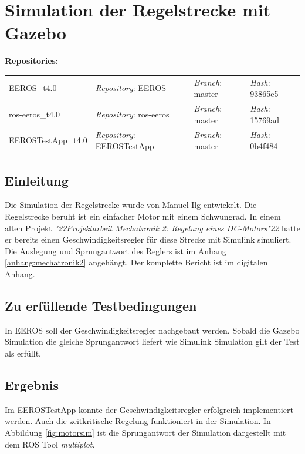 \section{Simulation der Regelstrecke mit Gazebo}
\textbf{Repositories:} \\
\begin{tabular}
  { l						| l			 							l								 l								}

  EEROS\_t4.0				& \textit{Repository}: EEROS			& \textit{Branch}: master		& \textit{Hash}: 93865e5		\\
  ros-eeros\_t4.0			& \textit{Repository}: ros-eeros		& \textit{Branch}: master		& \textit{Hash}: 15769ad		\\
  EEROSTestApp\_t4.0		& \textit{Repository}: EEROSTestApp		& \textit{Branch}: master		& \textit{Hash}: 0b4f484		\\
\end{tabular}

\subsection{Einleitung}
Die Simulation der Regelstrecke wurde von Manuel Ilg entwickelt.
Die Regelstrecke beruht ist ein einfacher Motor mit einem Schwungrad.
In einem alten Projekt \textit{\char"22Projektarbeit Mechatronik 2: Regelung eines DC-Motors\char"22} hatte er bereits einen Geschwindigkeitsregler für diese Strecke mit Simulink simuliert.
Die Auslegung und Sprungantwort des Reglers ist im Anhang \ref{anhang:mechatronik2} angehängt.
Der komplette Bericht ist im digitalen Anhang.

\subsection{Zu erfüllende Testbedingungen}
In EEROS soll der Geschwindigkeitsregler nachgebaut werden.
Sobald die Gazebo Simulation die gleiche Sprungantwort liefert wie Simulink Simulation gilt der Test als erfüllt.

\subsection{Ergebnis}
Im EEROSTestApp konnte der Geschwindigkeitsregler erfolgreich implementiert werden.
Auch die zeitkritische Regelung funktioniert in der Simulation.
In Abbildung \ref{fig:motorsim} ist die Sprungantwort der Simulation dargestellt mit dem ROS Tool \textit{multiplot}.

